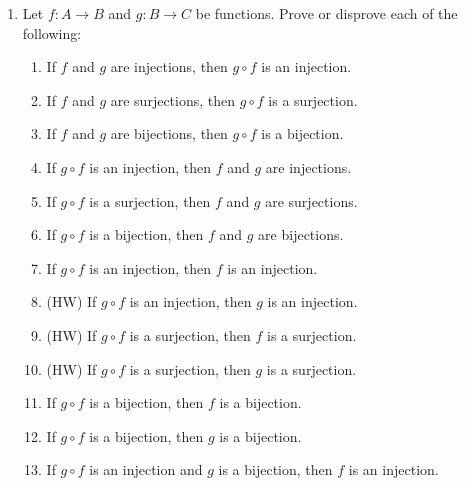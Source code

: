 \documentclass[12pt, reqno]{amsart}
\begin{document}
\begin{enumerate}
\newpage
\item   Let $f\colon A \to B$ and $g \colon B \to C$ be functions. Prove or disprove each of the following:
  \begin{enumerate}
  \item If $f$ and $g$ are injections, then $g \circ f$ is an injection.
  \item If $f$ and $g$ are surjections, then $g \circ f$ is a surjection.
  \item If $f$ and $g$ are bijections, then $g \circ f$ is a bijection.
  \item If $g \circ f$ is an injection, then $f$ and $g$ are injections.
  \item If $g \circ f$ is a surjection, then $f$ and $g$ are surjections.
  \item If $g \circ f$ is a bijection, then $f$ and $g$ are bijections.
  \item If $g \circ f$ is an injection, then $f$ is an injection.
  \item (HW) If $g \circ f$ is an injection, then $g$ is an injection.
  \item (HW) If $g \circ f$ is a surjection, then $f$ is a surjection.
  \item (HW) If $g \circ f$ is a surjection, then $g$ is a surjection.
  \item If $g \circ f$ is a bijection, then $f$ is a bijection.
  \item If $g \circ f$ is a bijection, then $g$ is a bijection.
  \item If $g \circ f$ is an injection and $g$ is a bijection, then $f$ is an
    injection.
  \end{enumerate}

\vspace{1in}


\end{enumerate}
\end{document}
